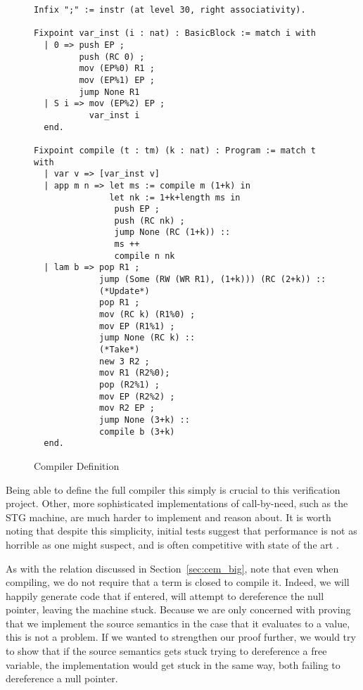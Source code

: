 \begin{figure}
\begin{lstlisting}
Infix ";" := instr (at level 30, right associativity).

Fixpoint var_inst (i : nat) : BasicBlock := match i with
  | 0 => push EP ;
         push (RC 0) ;
         mov (EP%0) R1 ;
         mov (EP%1) EP ;
         jump None R1
  | S i => mov (EP%2) EP ;
           var_inst i
  end.

Fixpoint compile (t : tm) (k : nat) : Program := match t with
  | var v => [var_inst v]
  | app m n => let ms := compile m (1+k) in
               let nk := 1+k+length ms in
                push EP ;
                push (RC nk) ;
                jump None (RC (1+k)) ::
                ms ++
                compile n nk
  | lam b => pop R1 ;
             jump (Some (RW (WR R1), (1+k))) (RC (2+k)) ::
             (*Update*)
             pop R1 ;
             mov (RC k) (R1%0) ;
             mov EP (R1%1) ;
             jump None (RC k) ::
             (*Take*)
             new 3 R2 ;
             mov R1 (R2%0);
             pop (R2%1) ;
             mov EP (R2%2) ;
             mov R2 EP ;
             jump None (3+k) ::
             compile b (3+k)
  end. 
\end{lstlisting}
\caption{Compiler Definition}
\label{fig:compiler}
\end{figure}

Being able to define the full compiler this simply is crucial to this
verification project. Other, more sophisticated implementations of call-by-need,
such as the STG machine, are much harder to implement and reason about. It is
worth noting that despite this simplicity, initial tests suggest that performance
is not as horrible as one might suspect, and is often competitive with state of
the art \cite{cem}.

As with the relation discussed in Section~\ref{sec:cem_big}, note that even when
compiling, we do not require that a term is closed to compile it. Indeed, we
will happily generate code that if entered, will attempt to dereference the null
pointer, leaving the machine stuck. Because we are only concerned with proving
that we implement the source semantics in the case that it evaluates to a value,
this is not a problem. If we wanted to strengthen our proof further, we would
try to show that if the source semantics gets stuck trying to dereference a free
variable, the implementation would get stuck in the same way, both failing to
dereference a null pointer.    
